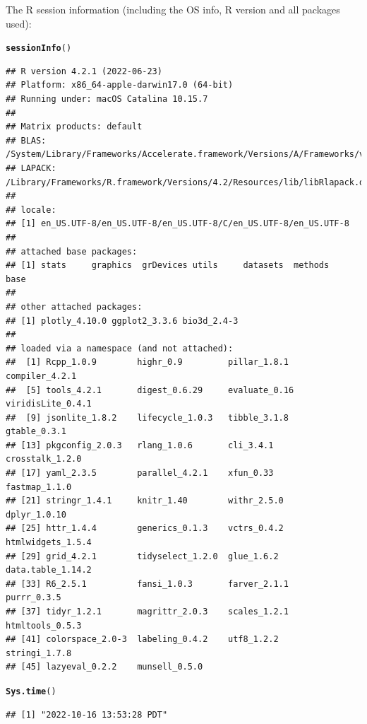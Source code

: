 \documentclass{article}\usepackage[]{graphicx}\usepackage[]{xcolor}
\makeatletter
\newcommand{\hlstd}[1]{\textcolor[rgb]{0.345,0.345,0.345}{#1}}%
\newcommand{\hlkwd}[1]{\textcolor[rgb]{0.737,0.353,0.396}{\textbf{#1}}}%
\newenvironment{kframe}{%
 \def\at@end@of@kframe{}%
 \ifinner\ifhmode%
  \def\at@end@of@kframe{\end{minipage}}%
  \begin{minipage}{\columnwidth}%
 \fi\fi%
 \def\FrameCommand##1{\hskip\@totalleftmargin \hskip-\fboxsep
 \colorbox{shadecolor}{##1}\hskip-\fboxsep
     \hskip-\linewidth \hskip-\@totalleftmargin \hskip\columnwidth}%
 \MakeFramed {\advance\hsize-\width
   \@totalleftmargin\z@ \linewidth\hsize
   \@setminipage}}%
 {\par\unskip\endMakeFramed%
 \at@end@of@kframe}
\newenvironment{knitrout}{}{} %
\makeatother
\begin{document}
The R session information (including the OS info, R version and all
packages used):

\begin{knitrout}
\color{fgcolor}\begin{kframe}
\begin{alltt}
\hlkwd{sessionInfo}\hlstd{()}
\end{alltt}
\begin{verbatim}
## R version 4.2.1 (2022-06-23)
## Platform: x86_64-apple-darwin17.0 (64-bit)
## Running under: macOS Catalina 10.15.7
## 
## Matrix products: default
## BLAS:   /System/Library/Frameworks/Accelerate.framework/Versions/A/Frameworks/vecLib.framework/Versions/A/libBLAS.dylib
## LAPACK: /Library/Frameworks/R.framework/Versions/4.2/Resources/lib/libRlapack.dylib
## 
## locale:
## [1] en_US.UTF-8/en_US.UTF-8/en_US.UTF-8/C/en_US.UTF-8/en_US.UTF-8
## 
## attached base packages:
## [1] stats     graphics  grDevices utils     datasets  methods   base     
## 
## other attached packages:
## [1] plotly_4.10.0 ggplot2_3.3.6 bio3d_2.4-3  
## 
## loaded via a namespace (and not attached):
##  [1] Rcpp_1.0.9        highr_0.9         pillar_1.8.1      compiler_4.2.1   
##  [5] tools_4.2.1       digest_0.6.29     evaluate_0.16     viridisLite_0.4.1
##  [9] jsonlite_1.8.2    lifecycle_1.0.3   tibble_3.1.8      gtable_0.3.1     
## [13] pkgconfig_2.0.3   rlang_1.0.6       cli_3.4.1         crosstalk_1.2.0  
## [17] yaml_2.3.5        parallel_4.2.1    xfun_0.33         fastmap_1.1.0    
## [21] stringr_1.4.1     knitr_1.40        withr_2.5.0       dplyr_1.0.10     
## [25] httr_1.4.4        generics_0.1.3    vctrs_0.4.2       htmlwidgets_1.5.4
## [29] grid_4.2.1        tidyselect_1.2.0  glue_1.6.2        data.table_1.14.2
## [33] R6_2.5.1          fansi_1.0.3       farver_2.1.1      purrr_0.3.5      
## [37] tidyr_1.2.1       magrittr_2.0.3    scales_1.2.1      htmltools_0.5.3  
## [41] colorspace_2.0-3  labeling_0.4.2    utf8_1.2.2        stringi_1.7.8    
## [45] lazyeval_0.2.2    munsell_0.5.0
\end{verbatim}
\begin{alltt}
\hlkwd{Sys.time}\hlstd{()}
\end{alltt}
\begin{verbatim}
## [1] "2022-10-16 13:53:28 PDT"
\end{verbatim}
\end{kframe}
\end{knitrout}
\end{document}
